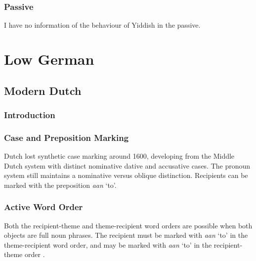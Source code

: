 \subsection{Passive}
I have no information of the behaviour of Yiddish in the passive.



\chapter{Low German}

\section{Modern Dutch}\label{sec:ModDutch}
\subsection{Introduction}
\subsection{Case and Preposition Marking}
Dutch lost synthetic case marking around 1600, developing from the Middle Dutch system with distinct nominative dative and accusative cases. The pronoun system still maintains a nominative versus oblique distinction. Recipients can be marked with the preposition \emph{aan} `to'.
\subsection{Active Word Order}
Both the recipient-theme and theme-recipient word orders are possible when both objects are full noun phrases. The recipient must be marked with \emph{aan} `to' in the theme-recipient word order, and may be marked with \emph{aan} `to' in the recipient-theme order \citep{SchermerVermeer.1991,Broekhuis.1994,DenDikken.1995,vanBelle.1996b}.

